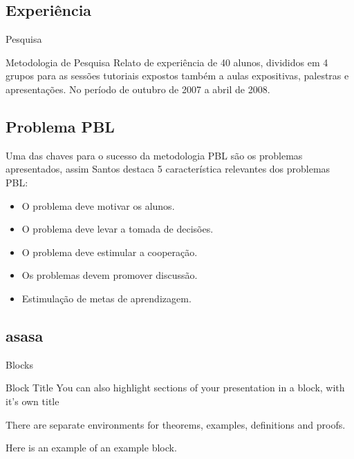 \documentclass{beamer}
\begin{document}
\subsection{Experiência}

 \begin{frame}{Pesquisa}
\begin{block}{Metodologia de Pesquisa}
Relato de experiência de 40 alunos, divididos em 4 grupos para as sessões tutoriais
expostos também a aulas expositivas, palestras e apresentações. No período de outubro
de 2007 a abril de 2008. 
\end{block}
\end{frame}

\subsection{Problema PBL}

\begin{frame}

Uma das chaves para o sucesso da metodologia PBL são os problemas
apresentados, assim Santos destaca 5 característica relevantes
dos problemas PBL:

\begin{itemize}
\item O problema deve motivar os alunos.
\item O problema deve levar a tomada de decisões.
\item O problema deve estimular a cooperação.
\item Os problemas devem promover discussão.
\item Estimulação de metas de aprendizagem.
\end{itemize}
\end{frame}




\subsection{asasa}

\begin{frame}{Blocks}
\begin{block}{Block Title}
You can also highlight sections of your presentation in a block, with it's own title
\end{block}
\begin{theorem}
There are separate environments for theorems, examples, definitions and proofs.
\end{theorem}
\begin{example}
Here is an example of an example block.
\end{example}
\end{frame}
\end{document}
